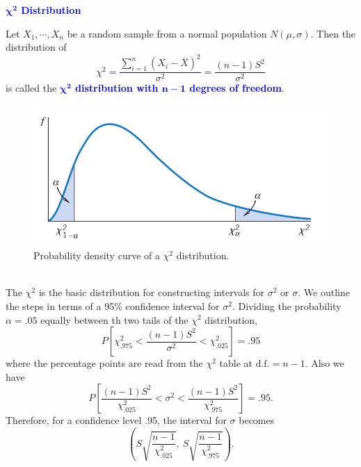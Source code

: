 \documentclass[12pt,a4paper]{article}
\newcommand{\df}{\text{d.f.}}
\begin{document}
\begin{tcolorbox}[colback=white]\begin{center}
		\textcolor{blue}{\bf $\boldsymbol{\chi^2}$ Distribution}
	\end{center} Let $X_1,\cdots,X_n$ be a random sample from a normal population $N(\mu,\sigma)$. Then the distribution of \[
\chi^2=\frac{\sum_{i=1}^n(X_i-\overline{X})^2}{\sigma^2}=\frac{(n-1)S^2}{\sigma^2}
\] is called the \textcolor{blue}{\bf $\boldsymbol{\chi^2}$ distribution with $\boldsymbol{n-1}$ degrees of freedom}.
\end{tcolorbox}\begin{figure}[h!]
\centering
\includegraphics[scale=.3]{chi_square.png}
\caption{Probability density curve of a $\chi^2$ distribution.}
\end{figure}\
\\
The $\chi^2$ is the basic distribution for constructing intervals for $\sigma^2$ or $\sigma$. We outline the steps in terms of a 95\% confidence interval for $\sigma^2$. Dividing the probability $\alpha = .05$ equally between th two tails of the $\chi^2$ distribution, \[
P\left[\chi_{.975}^2<\frac{(n-1)S^2}{\sigma^2}<\chi_{.025}^2\right] = .95
\] where the percentage points are read from the $\chi^2$ table at $\df=n-1$. Also we have \[
P\left[\frac{(n-1)S^2}{\chi_{.025}^2}<\sigma^2<\frac{(n-1)S^2}{\chi_{.975}^2}\right] = .95.
\] Therefore, for a confidence level .95, the interval for $\sigma$ becomes \[
\left(S\sqrt{\frac{n-1}{\chi_{.025}^2}},\ S\sqrt{\frac{n-1}{\chi_{.975}^2}}\right).
\]
\end{document}
